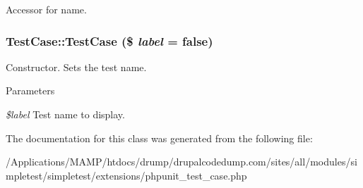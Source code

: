 Accessor for name. \hypertarget{class_test_case_aa9f6e3096465c14ae196869c4062dcbf}{
\subsubsection[{TestCase}]{\setlength{\rightskip}{0pt plus 5cm}TestCase::TestCase (\$ {\em label} = {\ttfamily false})}}
\label{class_test_case_aa9f6e3096465c14ae196869c4062dcbf}
Constructor. Sets the test name. 
\begin{DoxyParams}{Parameters}
\item[{\em \$label}]Test name to display. \end{DoxyParams}


The documentation for this class was generated from the following file:\begin{DoxyCompactItemize}
\item 
/Applications/MAMP/htdocs/drump/drupalcodedump.com/sites/all/modules/simpletest/simpletest/extensions/phpunit\_\-test\_\-case.php\end{DoxyCompactItemize}
